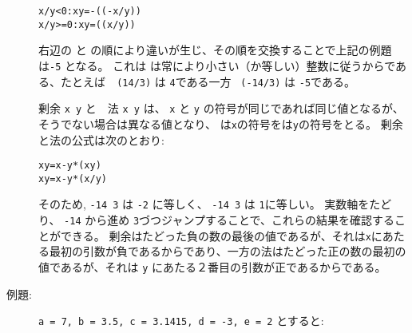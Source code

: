 \documentclass[\pformat,12pt]{jarticle}
\begin{document}
\begin{description}
  \begin{alltt}
    x/y <  0:   x  y = -((-x/y))
    x/y >= 0:   x  y =  ((x/y))
  \end{alltt}

 右辺の と の順により違いが生じ、その順を交換することで上記の例題は{\tt -5} となる。 
これは  は常により小さい（か等しい）整数に従うからである、たとえば\ {\tt {} (14/3)} は {\tt    4}である一方  {\tt {} (-14/3)} は {\tt -5}である。

剰余 {\tt x  y} と　法 {\tt x  y} は、
 {\tt x} と {\tt y} の符号が同じであれば同じ値となるが、そうでない場合は異なる値となり、 は{\tt x}の符号をは{\tt y}の符号をとる。
剰余と法の公式は次のとおり:
  \begin{alltt}
    x  y = x - y * (x  y)
    x  y = x - y * (x/y)
  \end{alltt}
 そのため, {\tt -14  3} は {\tt -2} に等しく、 {\tt -14
     3} は {\tt 1}に等しい。 
実数軸をたどり、 {\tt -14} から進め {\tt 3}づつジャンプすることで、これらの結果を確認することができる。 
剰余はたどった負の数の最後の値であるが、それは{\tt x}にあたる最初の引数が負であるからであり、一方の法はたどった正の数の最初の値であるが、それは {\tt y} にあたる２番目の引数が正であるからである。

\item[例題:]  {\tt a = 7, b = 3.5, c = 3.1415, d = -3, e = 2} とすると:


\end{description}
\end{document}
